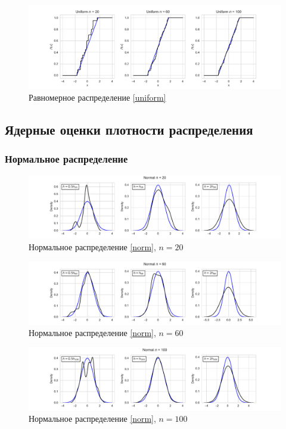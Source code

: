 \documentclass[a4paper]{article}
\begin{document}
\begin{figure}[H]
    \centering
    \includegraphics[width = 16 cm]{sources/uniformECDF.pdf}
    \caption{Равномерное распределение \eqref{uniform}}
    \label{fig:uniformECDF}
\end{figure}
\subsection{Ядерные оценки плотности распределения}
\subsubsection{Нормальное распределение}
\begin{figure}[H]
    \centering
    \includegraphics[width = 16 cm]{sources/normalKde20.pdf}
    \caption{Нормальное распределение \eqref{norm}, $n = 20$}
    \label{fig:normKDE20}
\end{figure}
\begin{figure}[H]
    \centering
    \includegraphics[width = 16 cm]{sources/normalKde60.pdf}
    \caption{Нормальное распределение \eqref{norm}, $n = 60$}
    \label{fig:normKDE60}
\end{figure}
\begin{figure}[H]
    \centering
    \includegraphics[width = 16 cm]{sources/normalKde100.pdf}
    \caption{Нормальное распределение \eqref{norm}, $n = 100$}
    \label{fig:normKDE100}
\end{figure}
\end{document}
